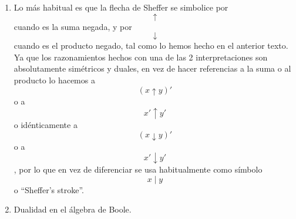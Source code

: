 \begin{enumerate}
\begin{enumerate}
\begin{enumerate}
\begin{enumerate}
\begin{enumerate}
          \begin{enumerate}
          \def\labelenumvi{\arabic{enumvi}.}
          \item
            \[\forall x\exists y{{x \cdot y} = 0}\]

            \begin{enumerate}
            \def\labelenumvii{\arabic{enumvii}.}
            \tightlist
            \item
              \[y{: = x}@{x = x}'\]
            \item
              \[{x \cdot x}{' = {({x@x'})}}{' = 1}{' = 0}\]
            \end{enumerate}
          \item
            \[\forall x\exists y{{x + y} = 1}\]

            \begin{enumerate}
            \def\labelenumvii{\arabic{enumvii}.}
            \tightlist
            \item
              \[y{: = x}@{x = x}'\]
            \item
              \[{x + x}{{{' = {x'@x}} = {x@x'}} = 1}\]
            \end{enumerate}
          \end{enumerate}
        \item
          Definición: \[\overline{x} ≝ {x@x}{\equiv}x'\]
        \end{enumerate}
      \end{enumerate}
    \item
      Lo más habitual es que la flecha de Sheffer se simbolice por
      \[\uparrow\] cuando es la suma negada, y por \[\downarrow\]cuando
      es el producto negado, tal como lo hemos hecho en el anterior
      texto. Ya que los razonamientos hechos con una de las 2
      interpretaciones son absolutamente simétricos y duales, en vez de
      hacer referencias a la suma o al producto lo hacemos a
      \[{({x \uparrow y})}'\]o a \[x' \uparrow y'\]o idénticamente a
      \[{({x \downarrow y})}'\]o a \[x' \downarrow y'\], por lo que en
      vez de diferenciar se usa habitualmente como símbolo \[x \mid y\]o
      ``Sheffer's stroke''.
    \item
      Dualidad en el álgebra de Boole.


\end{enumerate}
\end{enumerate}
\end{enumerate}

